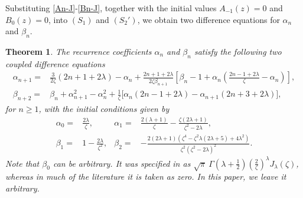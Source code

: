 \documentclass[11pt,a4paper]{article}
\newtheorem{theorem}{Theorem}[section]
\numberwithin{equation}{section}
\begin{document}
Substituting \eqref{An-J}-\eqref{Bn-J}, together with the initial values $A_{-1}(z)=0$ and $B_0(z)=0$, into $(S_1)$ and $(S_2')$, we obtain two difference equations for $\alpha_n$ and $\beta_n$.
\begin{theorem} The recurrence coefficients $\alpha_n$ and $\beta_n$ satisfy the following two coupled difference equations
\begin{align}
\alpha_{n+1}=&\frac{3}{2\zeta}\left(2n+1+2\lambda\right)-\alpha_{n}+\frac{2n+1+2\lambda}{2\zeta\beta_{n+1}}\left[\beta_{n}-1+\alpha_{n}\left(\frac{2n-1+2\lambda}{\zeta}-\alpha_{n}\right)\right],\label{diff2}\\
\beta_{n+2}=&\beta_n+\alpha_{n+1}^2-\alpha_n^2+\frac{1}{\zeta}\big[\alpha_n(2n-1+2\lambda)-\alpha_{n+1}(2n+3+2\lambda)\big],\label{diff1}
\end{align}
for $n\geq1$, with the initial conditions given by
\begin{subequations}\label{al0bt1}
\begin{align}
\alpha_0=&\frac{2\lambda}{\zeta},&\alpha_1=&\frac{2(\lambda+1)}{\zeta}-\frac{\zeta(2\lambda+1)}{\zeta^2-2\lambda},\\
\beta_{1}=&1-\frac{2\lambda}{\zeta^2}, &\beta_2=&-\frac{2(2\lambda+1)\left(\zeta ^4-\zeta ^2 \lambda  (2 \lambda +5)+4 \lambda ^2\right)}{\zeta^2(\zeta^2-2\lambda)^2}.
\end{align}
\end{subequations}
Note that $\beta_0$ can be arbitrary. It was specified in \cite{MCM} as $\sqrt{\pi}~\Gamma\left(\lambda+\frac{1}{2}\right)\left(\frac{2}{\zeta}\right)^{\lambda}J_{\lambda}(\zeta)$, whereas in much of the literature it is taken as zero. In this paper, we leave it arbitrary.
\end{theorem}
\end{document}
